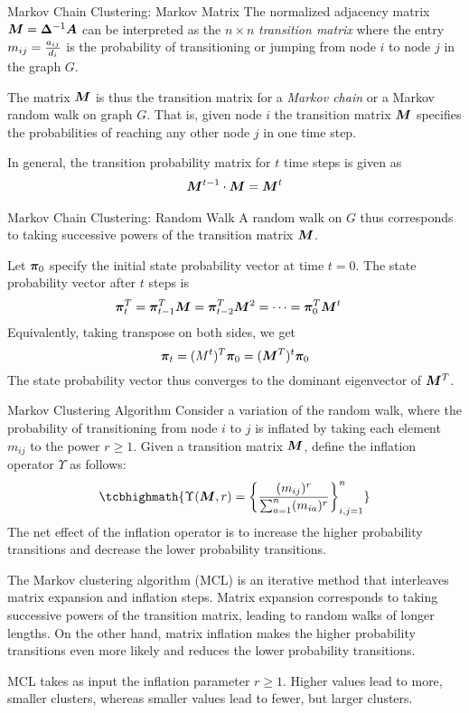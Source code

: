 \begin{frame}{Markov Chain Clustering: Markov Matrix}
The normalized adjacency matrix
${\boldsymbol M} = {\bm \Delta}^{-1} {\boldsymbol A}$ can be interpreted as
the $n\times n$ {\em transition matrix} where the entry $m_{ij} =
{a_{ij} \over d_i}$ is the probability of
transitioning or jumping from node $i$ to node $j$ in the graph
$G$. 

\medskip
The matrix ${\boldsymbol M}$ is thus the transition matrix for a {\em Markov
chain} 
or a Markov random walk on
graph $G$. That is,
given node $i$ the transition matrix ${\boldsymbol M}$ specif\/{i}es the
probabilities of reaching any other node $j$ in one time step.


\medskip
In general, the transition probability matrix
for
 $t$ time steps is given as
\begin{align*}
     {\boldsymbol M}^{t-1} \cdot {\boldsymbol M} = {\boldsymbol M}^t
\end{align*}
\end{frame}

\begin{frame}{Markov Chain Clustering: Random Walk}
A random walk on $G$ thus corresponds to taking successive powers
of the transition matrix ${\boldsymbol M}$. 

\medskip
Let ${\bm \pi}_0$ specify the initial
state probability vector at time $t=0$.
The state probability vector after 
$t$ steps is
\begin{align*}
    {\bm \pi}_t^T & = {\bm \pi}_{t-1}^T {\boldsymbol M} =
    {\bm \pi}_{t-2}^T{\boldsymbol M}^2 = \cdots
     = {\bm \pi}_0^T {\boldsymbol M}^{t}
\end{align*}
Equivalently, taking transpose on both sides, we
get
  $${\bm \pi}_t  = (M^t)^T {\bm \pi}_0 = ({\boldsymbol M}^T)^t {\bm \pi}_0$$
The state probability vector thus converges to the dominant
eigenvector of ${\boldsymbol M}^T$.
\end{frame}


\begin{frame}{Markov Clustering Algorithm}
Consider a variation of the random walk, where the
probability of transitioning from node $i$ to $j$ is inflated by
taking each element $m_{ij}$ to the power $r \ge 1$. Given a
transition matrix ${\boldsymbol M}$, def\/{i}ne the inflation operator $\Upsilon$
as follows:
\begin{align*}
\tcbhighmath{
    \Upsilon(\bM,r) = \lB\{
        \frac{(m_{ij})^r}{\sum_{a=1}^n (m_{ia})^r}
    \rB\}_{i,j=1}^n
}
\end{align*}
The net
effect of the inflation operator is to increase the higher
probability transitions and decrease the lower probability
transitions.

\medskip
The Markov clustering
algorithm (MCL) is an iterative method that interleaves matrix expansion
and inflation steps. Matrix expansion corresponds to taking
successive powers of the transition matrix, leading to random
walks of longer lengths. On the other hand, matrix inflation makes
the higher probability transitions even more likely and reduces
the lower probability transitions.

\medskip
MCL
takes as input the inflation parameter $r\ge1$. Higher values lead
to more, smaller clusters, whereas smaller values lead to fewer,
but larger clusters.  

\end{frame}


